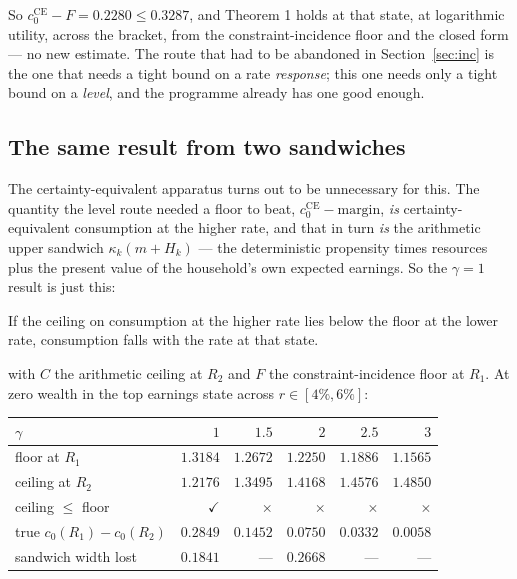 So $c_0^{\mathrm{CE}}-F=0.2280\le0.3287$, and Theorem 1 holds at that state, at logarithmic utility,
across the bracket, from the constraint-incidence floor and the closed form --- no new estimate. The
route that had to be abandoned in Section~\ref{sec:inc} is the one that needs a tight bound on a rate
\emph{response}; this one needs only a tight bound on a \emph{level}, and the programme already has
one good enough.

\subsection{The same result from two sandwiches}

The certainty-equivalent apparatus turns out to be unnecessary for this. The quantity the level route
needed a floor to beat, $c_0^{\mathrm{CE}}-\text{margin}$, \emph{is} certainty-equivalent consumption
at the higher rate, and that in turn \emph{is} the arithmetic upper sandwich
$\kappa_k(m+H_k)$ --- the deterministic propensity times resources plus the present value of the
household's own expected earnings. So the $\gamma=1$ result is just this:

\begin{proposition}\label{prop:twosand}
If the ceiling on consumption at the higher rate lies below the floor at the lower rate, consumption
falls with the rate at that state.
\end{proposition}

with $C$ the arithmetic ceiling at $R_2$ and $F$ the constraint-incidence floor at $R_1$. At zero
wealth in the top earnings state across $r\in[4\%,6\%]$:

\begin{center}
\begin{tabular}{lrrrrr}
\toprule
$\gamma$ & $1$ & $1.5$ & $2$ & $2.5$ & $3$\\
\midrule
floor at $R_1$ & $1.3184$ & $1.2672$ & $1.2250$ & $1.1886$ & $1.1565$\\
ceiling at $R_2$ & $1.2176$ & $1.3495$ & $1.4168$ & $1.4576$ & $1.4850$\\
ceiling $\le$ floor & $\checkmark$ & $\times$ & $\times$ & $\times$ & $\times$\\
\midrule
true $c_0(R_1)-c_0(R_2)$ & $0.2849$ & $0.1452$ & $0.0750$ & $0.0332$ & $0.0058$\\
sandwich width lost & $0.1841$ & --- & $0.2668$ & --- & ---\\
\bottomrule
\end{tabular}
\end{center}

